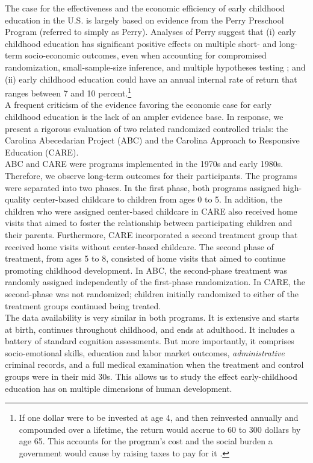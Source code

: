 \noindent  The case for the effectiveness and the economic efficiency of early childhood education in the U.S. is largely based on evidence from the Perry Preschool Program (referred to simply as Perry). Analyses of Perry suggest that (i) early childhood education has significant positive effects on multiple short- and long-term socio-economic outcomes, even when accounting for compromised randomization, small-sample-size inference, and multiple hypotheses testing \citep{Heckman_Moon_etal_2010_QE}; and (ii) early childhood education could have an annual internal rate of return that ranges between 7 and 10 percent.\footnote{If one dollar were to be invested at age 4, and then reinvested annually and compounded over a lifetime, the return would accrue to 60 to 300 dollars by age 65. This accounts for the program's cost and the social burden a government would cause by raising taxes to pay for it \citep{Heckman_Moon_etal_2010_RateofReturn}.}\\

\noindent A frequent criticism of the evidence favoring the economic case for early childhood education is the lack of an ampler evidence base. In response, we present a rigorous evaluation of two related randomized controlled trials: the Carolina Abecedarian Project (ABC) and the Carolina Approach to Responsive Education (CARE).\\ 

\noindent ABC and CARE were programs implemented in the 1970s and early 1980s. Therefore, we observe long-term outcomes for their participants. The programs were separated into two phases. In the first phase, both programs assigned high-quality center-based childcare to children from ages 0 to 5. In addition, the children who were assigned center-based childcare in CARE also received home visits that aimed to foster the relationship between participating children and their parents. Furthermore, CARE incorporated a second treatment group that received home visits without center-based childcare. The second phase of treatment, from ages 5 to 8, consisted of home visits that aimed to continue promoting childhood development. In ABC, the second-phase treatment was randomly assigned independently of the first-phase randomization. In CARE, the second-phase was not randomized; children initially randomized to either of the treatment groups continued being treated.\\

\noindent The data availability is very similar in both programs. It is extensive and starts at birth, continues throughout childhood, and ends at adulthood. It includes a battery of standard cognition assessments. But more importantly, it comprises socio-emotional skills, education and labor market outcomes, \textit{administrative} criminal records, and a full medical examination when the treatment and control groups were in their mid 30s. This allows us to study the effect early-childhood education has on multiple dimensions of human development.\\

